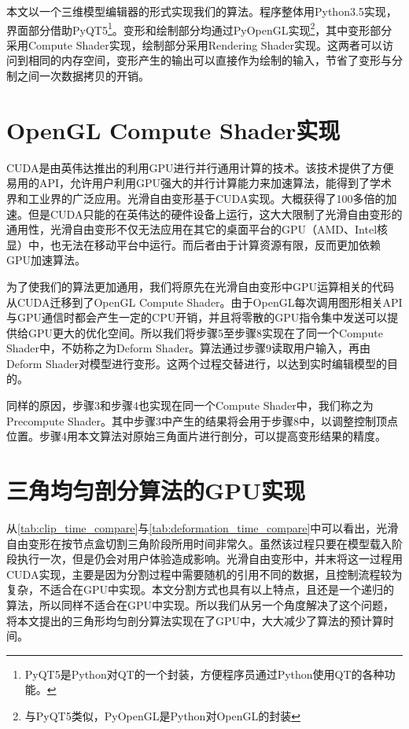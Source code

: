 本文以一个三维模型编辑器的形式实现我们的算法。程序整体用Python3.5实现，界面部分借助PyQT5\footnote{PyQT5是Python对QT的一个封装，方便程序员通过Python使用QT的各种功能。}。变形和绘制部分均通过PyOpenGL实现\footnote{与PyQT5类似，PyOpenGL是Python对OpenGL的封装}，其中变形部分采用Compute Shader实现，绘制部分采用Rendering Shader实现。这两者可以访问到相同的内存空间，变形产生的输出可以直接作为绘制的输入，节省了变形与分制之间一次数据拷贝的开销。


\section{OpenGL Compute Shader实现}
CUDA是由英伟达推出的利用GPU进行并行通用计算的技术。该技术提供了方便易用的API，允许用户利用GPU强大的并行计算能力来加速算法，能得到了学术界和工业界的广泛应用。光滑自由变形\cite{Cui15}基于CUDA实现。大概获得了100多倍的加速。但是CUDA只能的在英伟达的硬件设备上运行，这大大限制了光滑自由变形的通用性，光滑自由变形不仅无法应用在其它的桌面平台的GPU（AMD、Intel核显）中，也无法在移动平台中运行。而后者由于计算资源有限，反而更加依赖GPU加速算法。

为了使我们的算法更加通用，我们将原先在光滑自由变形中GPU运算相关的代码从CUDA迁移到了OpenGL Compute Shader。由于OpenGL每次调用图形相关API与GPU通信时都会产生一定的CPU开销，并且将零散的GPU指令集中发送可以提供给GPU更大的优化空间。所以我们将步骤5至步骤8实现在了同一个Compute Shader中，不妨称之为Deform Shader。算法通过步骤9读取用户输入，再由Deform Shader对模型进行变形。这两个过程交替进行，以达到实时编辑模型的目的。

同样的原因，步骤3和步骤4也实现在同一个Compute Shader中，我们称之为Precompute Shader。其中步骤3中产生的结果将会用于步骤8中，以调整控制顶点位置。步骤4用本文算法对原始三角面片进行剖分，可以提高变形结果的精度。


\section{三角均匀剖分算法的GPU实现}
从\autoref{tab:clip_time_compare}与\autoref{tab:deformation_time_compare}中可以看出，光滑自由变形在按节点盒切割三角阶段所用时间非常久。虽然该过程只要在模型载入阶段执行一次，但是仍会对用户体验造成影响。光滑自由变形中，并末将这一过程用CUDA实现，主要是因为分割过程中需要随机的引用不同的数据，且控制流程较为复杂，不适合在GPU中实现。本文分割方式也具有以上特点，且还是一个递归的算法，所以同样不适合在GPU中实现。所以我们从另一个角度解决了这个问题，将本文提出的三角形均匀剖分算法实现在了GPU中，大大减少了算法的预计算时间。

